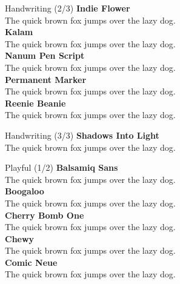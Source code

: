 \documentclass[10pt]{beamer}
\begin{document}
\begin{frame}{Handwriting (2/3)}
\vspace{-0.2cm}
  {\IndieFlowerLocal\Large\bfseries Indie Flower\\}
  {\IndieFlowerLocal The quick brown fox jumps over the lazy dog.\\[0.3cm]}
  {\KalamLocal\Large\bfseries Kalam\\}
  {\KalamLocal The quick brown fox jumps over the lazy dog.\\[0.3cm]}
  {\NanumPenScriptLocal\Large\bfseries Nanum Pen Script\\}
  {\NanumPenScriptLocal The quick brown fox jumps over the lazy dog.\\[0.3cm]}
  {\PermanentMarkerLocal\Large\bfseries Permanent Marker\\}
  {\PermanentMarkerLocal The quick brown fox jumps over the lazy dog.\\[0.3cm]}
  {\ReenieBeanieLocal\Large\bfseries Reenie Beanie\\}
  {\ReenieBeanieLocal The quick brown fox jumps over the lazy dog.\\[0.3cm]}
\end{frame}

\begin{frame}{Handwriting (3/3)}
\vspace{-0.2cm}
  {\ShadowsIntoLightLocal\Large\bfseries Shadows Into Light\\}
  {\ShadowsIntoLightLocal The quick brown fox jumps over the lazy dog.\\[0.3cm]}
\end{frame}

\begin{frame}{Playful (1/2)}
\vspace{-0.2cm}
  {\BalsamiqSansLocal\Large\bfseries Balsamiq Sans\\}
  {\BalsamiqSansLocal The quick brown fox jumps over the lazy dog.\\[0.3cm]}
  {\BoogalooLocal\Large\bfseries Boogaloo\\}
  {\BoogalooLocal The quick brown fox jumps over the lazy dog.\\[0.3cm]}
  {\CherryBombOneLocal\Large\bfseries Cherry Bomb One\\}
  {\CherryBombOneLocal The quick brown fox jumps over the lazy dog.\\[0.3cm]}
  {\ChewyLocal\Large\bfseries Chewy\\}
  {\ChewyLocal The quick brown fox jumps over the lazy dog.\\[0.3cm]}
  {\ComicNeueLocal\Large\bfseries Comic Neue\\}
  {\ComicNeueLocal The quick brown fox jumps over the lazy dog.\\[0.3cm]}
\end{frame}
\end{document}
